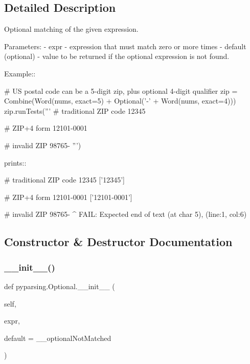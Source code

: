\subsection{Detailed Description}
\begin{DoxyVerb}Optional matching of the given expression.

Parameters:
 - expr - expression that must match zero or more times
 - default (optional) - value to be returned if the optional expression is not found.

Example::

    # US postal code can be a 5-digit zip, plus optional 4-digit qualifier
    zip = Combine(Word(nums, exact=5) + Optional('-' + Word(nums, exact=4)))
    zip.runTests('''
        # traditional ZIP code
        12345

        # ZIP+4 form
        12101-0001

        # invalid ZIP
        98765-
        ''')

prints::

    # traditional ZIP code
    12345
    ['12345']

    # ZIP+4 form
    12101-0001
    ['12101-0001']

    # invalid ZIP
    98765-
         ^
    FAIL: Expected end of text (at char 5), (line:1, col:6)
\end{DoxyVerb}
 

\subsection{Constructor \& Destructor Documentation}
\mbox{\label{classpyparsing_1_1Optional_ae7cdc2f551349f35f0ad2697aa4856f1}} 
\subsubsection{\texorpdfstring{\+\_\+\+\_\+init\+\_\+\+\_\+()}{\_\_init\_\_()}}
{\footnotesize\ttfamily def pyparsing.\+Optional.\+\_\+\+\_\+init\+\_\+\+\_\+ (\begin{DoxyParamCaption}\item[{}]{self,  }\item[{}]{expr,  }\item[{}]{default = {\ttfamily \+\_\+\+\_\+optionalNotMatched} }\end{DoxyParamCaption})}



